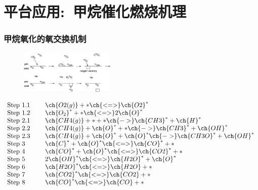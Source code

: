 \documentclass[cjk,slidestop,compress,mathserif,blue]{beamer}
\begin{document}
\section{平台应用:~甲烷催化燃烧机理}
\frame
{
	\frametitle{甲烷氧化的氧交换机制}
\begin{figure}[h!]
\centering
\vskip -12pt
\includegraphics[height=0.8in]{Figures/Oxygen_exchange_mechanism_for_CH4_oxidation.png}
\caption{\fontsize{5.5pt}{4.2pt}\selectfont{催化剂表面甲烷氧化的氧交换过程示意}}%
\label{CH4_comp_mechan}
\end{figure}
\vskip -10pt
	{\fontsize{9.5pt}{11pt}\selectfont
\begin{displaymath}
	\begin{array}{ll}
		\mathrm{Step~1.1}\quad~&\ch{O2(g)}+{\ast}\ch{<=>}\ch{O2}^{\ast} \\
		\mathrm{Step~1.2}\quad~&\ch{O_2}^{\ast}+{\ast}\ch{<=>}2\ch{O}^{\ast} \\
		\mathrm{Step~2.1}\quad~&\ch{CH4(g)}+{\ast}+{\ast}\ch{->}\ch{CH3}^{\ast}+\ch{H}^{\ast} \\
		\mathrm{Step~2.2}\quad~&\ch{CH4(g)}+\ch{O}^{\ast}+{\ast}\ch{->}\ch{CH3}^{\ast}+\ch{OH}^{\ast} \\
		\mathrm{Step~2.3}\quad~&\ch{CH4(g)}+\ch{O}^{\ast}+\ch{O}^{\ast}\ch{->}\ch{CH3O}^{\ast}+\ch{OH}^{\ast} \\
		\mathrm{Step~3}\quad~&\ch{C}^{\ast}+\ch{O}^{\ast}\ch{<=>}\ch{CO}^{\ast}+{\ast} \\
		\mathrm{Step~4}\quad~&\ch{CO}^{\ast}+\ch{O}^{\ast}\ch{<=>}\ch{CO2}^{\ast}+{\ast} \\
		\mathrm{Step~5}\quad~&2\ch{OH}^{\ast}\ch{<=>}\ch{H2O}^{\ast}+\ch{O}^{\ast} \\
		\mathrm{Step~6}\quad~&\ch{H2O}^{\ast}\ch{<=>}\ch{H2O}+{\ast} \\
		\mathrm{Step~7}\quad~&\ch{CO2}^{\ast}\ch{<=>}\ch{CO2}+{\ast} \\
		\mathrm{Step~8}\quad~&\ch{CO}^{\ast}\ch{<=>}\ch{CO}+{\ast}
	\end{array}
\end{displaymath}}
}
\end{document}
